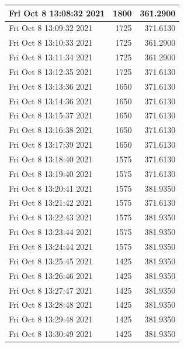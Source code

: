 \begin{longtable}{|l|r|r|}
Fri Oct  8 13:08:32 2021 &               1800 &        361.2900 \\ \hline
Fri Oct  8 13:09:32 2021 &               1725 &        371.6130 \\ \hline
Fri Oct  8 13:10:33 2021 &               1725 &        361.2900 \\ \hline
Fri Oct  8 13:11:34 2021 &               1725 &        361.2900 \\ \hline
Fri Oct  8 13:12:35 2021 &               1725 &        371.6130 \\ \hline
Fri Oct  8 13:13:36 2021 &               1650 &        371.6130 \\ \hline
Fri Oct  8 13:14:36 2021 &               1650 &        371.6130 \\ \hline
Fri Oct  8 13:15:37 2021 &               1650 &        371.6130 \\ \hline
Fri Oct  8 13:16:38 2021 &               1650 &        371.6130 \\ \hline
Fri Oct  8 13:17:39 2021 &               1650 &        371.6130 \\ \hline
Fri Oct  8 13:18:40 2021 &               1575 &        371.6130 \\ \hline
Fri Oct  8 13:19:40 2021 &               1575 &        371.6130 \\ \hline
Fri Oct  8 13:20:41 2021 &               1575 &        381.9350 \\ \hline
Fri Oct  8 13:21:42 2021 &               1575 &        371.6130 \\ \hline
Fri Oct  8 13:22:43 2021 &               1575 &        381.9350 \\ \hline
Fri Oct  8 13:23:44 2021 &               1575 &        381.9350 \\ \hline
Fri Oct  8 13:24:44 2021 &               1575 &        381.9350 \\ \hline
Fri Oct  8 13:25:45 2021 &               1425 &        381.9350 \\ \hline
Fri Oct  8 13:26:46 2021 &               1425 &        381.9350 \\ \hline
Fri Oct  8 13:27:47 2021 &               1425 &        381.9350 \\ \hline
Fri Oct  8 13:28:48 2021 &               1425 &        381.9350 \\ \hline
Fri Oct  8 13:29:48 2021 &               1425 &        381.9350 \\ \hline
Fri Oct  8 13:30:49 2021 &               1425 &        381.9350 \\ \hline

\end{longtable}
